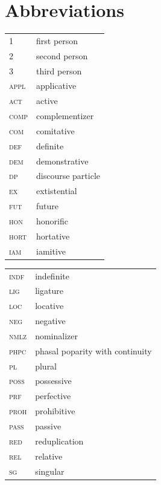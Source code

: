 \documentclass[output=paper]{langscibook}
\begin{document}
\section*{Abbreviations}
\begin{tabularx}{.45\textwidth}{lQ}
{\scshape 1} & first person\\
{\scshape 2} & second person\\
{\scshape 3} & third person\\
{\scshape appl} & applicative\\
{\scshape act} &  active \\
{\scshape comp} & complementizer\\
{\scshape com} & comitative\\
{\scshape def} & definite\\
{\scshape dem} & demonstrative\\
{\scshape dp} & discourse particle\\
{\scshape ex} & extistential \\
{\scshape fut} & future\\
{\scshape hon} & honorific\\
{\scshape hort} & hortative\\
{\scshape iam} & iamitive\\
\end{tabularx}
\begin{tabularx}{.45\textwidth}{lQ}
{\scshape indf} & indefinite\\
{\scshape lig} & ligature\\
{\scshape loc} & locative\\
{\scshape neg} & negative\\
{\scshape nmlz} & nominalizer\\
\scshape phpc & phasal poparity with continuity \\
{\scshape pl} & plural\\
{\scshape poss} & possessive\\
{\scshape prf} & perfective\\
{\scshape proh} & prohibitive\\
{\scshape pass} & passive \\
{\scshape red} & reduplication\\
{\scshape rel} & relative\\
{\scshape sg} & singular\\
\end{tabularx}



\sloppy\printbibliography[heading=subbibliography,notkeyword=this]
\end{document}
